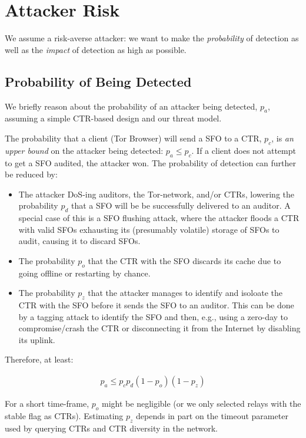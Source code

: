 \section{Attacker Risk}
We assume a risk-averse attacker: we want to make the \emph{probability} of
detection as well as the \emph{impact} of detection as high as possible.

\subsection{Probability of Being Detected}
We briefly reason about the probability of an attacker being detected, $p_a$,
assuming a simple CTR-based design and our threat model. 

The probability that a client (Tor Browser) will send a SFO to a CTR, $p_c$, is
\emph{an upper bound} on the attacker being detected: $p_a \leq p_c$. If a
client does not attempt to get a SFO audited, the attacker won. The probability
of detection can further be reduced by:

\begin{itemize}
    \item The attacker DoS-ing auditors, the Tor-network, and/or CTRs, lowering
    the probability $p_d$ that a SFO will be be successfully delivered to an
    auditor. A special case of this is a SFO flushing attack, where the attacker
    floods a CTR with valid SFOs exhausting its (presumably volatile) storage of
    SFOs to audit, causing it to discard SFOs.
    \item The probability $p_o$ that the CTR with the SFO discards its cache due
    to going offline or restarting by chance.
    \item The probability $p_z$ that the attacker manages to identify and
    isoloate the CTR with the SFO before it sends the SFO to an auditor. This
    can be done by a tagging attack to identify the SFO and then, e.g., using a
    zero-day to compromise/crash the CTR or disconnecting it from the Internet
    by disabling its uplink.
\end{itemize}

Therefore, at least: 

\begin{align}
    p_a \leq p_c p_d(1-p_o)(1-p_z)
\end{align}

For a short time-frame, $p_o$ might be negligible (or we only selected relays
with the stable flag as CTRs). Estimating $p_z$ depends in part on the timeout
parameter used by querying CTRs and CTR diversity in the network.

